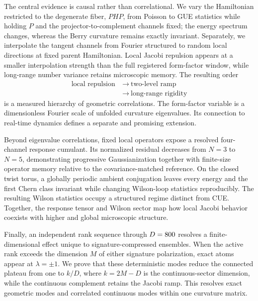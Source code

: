 The central evidence is causal rather than correlational.
We vary the Hamiltonian restricted to the degenerate fiber,
\(PHP\), from Poisson to GUE statistics while holding \(P\) and the
projector-to-complement channels fixed; the energy spectrum changes, whereas
the Berry curvature remains exactly invariant.
Separately, we interpolate the tangent channels from Fourier structured to
random local directions at fixed parent Hamiltonian.
Local Jacobi repulsion appears at a smaller interpolation strength than the
full registered form-factor window, while long-range number variance retains
microscopic memory.
The resulting order
\begin{equation}
 \begin{aligned}
 \text{local repulsion}
 &\ \longrightarrow\ \text{two-level ramp}\\
 &\ \longrightarrow\ \text{long-range rigidity}
 \end{aligned}
 \label{eq:headline-hierarchy}
\end{equation}
is a measured hierarchy of geometric correlations.
The form-factor variable is a dimensionless Fourier scale of unfolded
curvature eigenvalues.  Its connection to real-time dynamics defines a
separate and promising extension.

Beyond eigenvalue correlations, fixed local operators expose a resolved
four-channel response cumulant.  Its normalized residual decreases from
\(N=3\) to \(N=5\), demonstrating progressive Gaussianization together with
finite-size operator memory relative to the covariance-matched reference.
On the closed twist torus, a globally periodic ambient conjugation leaves
every energy and the first Chern class invariant while changing Wilson-loop
statistics reproducibly.
The resulting Wilson statistics occupy a structured regime distinct from CUE.
Together, the response tensor and Wilson sector map how local Jacobi behavior
coexists with higher and global microscopic structure.

Finally, an independent rank sequence through \(D=800\) resolves
a finite-dimensional effect unique to signature-compressed ensembles.
When the active rank exceeds the dimension \(M\) of either signature
polarization, exact atoms appear at \(\lambda=\pm1\).
We prove that these deterministic modes reduce the connected plateau from
one to \(k/D\), where \(k=2M-D\) is the continuous-sector dimension, while the
continuous complement retains the Jacobi ramp.
This resolves exact geometric modes and correlated continuous modes within
one curvature matrix.

